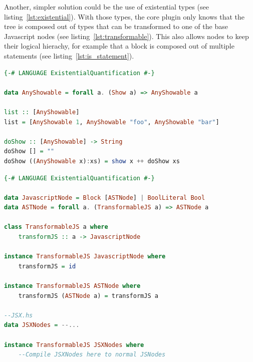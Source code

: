 Another, simpler solution could be the use of existential types (see listing~\ref{lst:existential}). With those types, the core plugin only knows that the tree is composed out of types that can be transformed to one of the base Javascript nodes (see listing~\ref{lst:transformable}). This also allows nodes to keep their logical hierachy, for example that a block is composed out of multiple statements (see listing~\ref{lst:is_statement}).

\begin{lstlisting}[linewidth=\columnwidth, caption={Example of an existential type}, captionpos=b, label=lst:existential, language=Haskell, breaklines=true]
{-# LANGUAGE ExistentialQuantification #-}

data AnyShowable = forall a. (Show a) => AnyShowable a

list :: [AnyShowable]
list = [AnyShowable 1, AnyShowable "foo", AnyShowable "bar"]

doShow :: [AnyShowable] -> String
doShow [] = ""
doShow ((AnyShowable x):xs) = show x ++ doShow xs

\end{lstlisting}

\begin{lstlisting}[linewidth=\columnwidth, caption={Existential type for Javascript AST}, captionpos=b, label=lst:transformable, language=Haskell, breaklines=true]
{-# LANGUAGE ExistentialQuantification #-}

data JavascriptNode = Block [ASTNode] | BoolLiteral Bool
data ASTNode = forall a. (TransformableJS a) => ASTNode a

class TransformableJS a where
    transformJS :: a -> JavascriptNode

instance TransformableJS JavascriptNode where
    transformJS = id

instance TransformableJS ASTNode where
    transformJS (ASTNode a) = transformJS a

--JSX.hs
data JSXNodes = --...

instance TransformableJS JSXNodes where
    --Compile JSXNodes here to normal JSNodes

\end{lstlisting}

